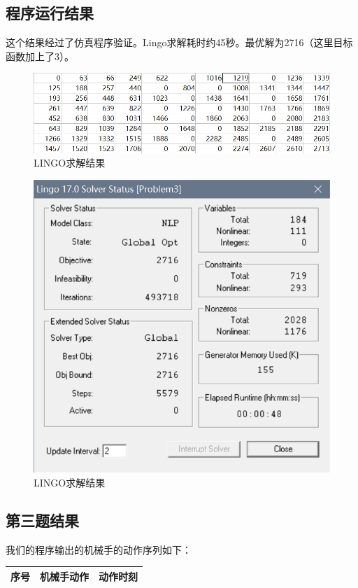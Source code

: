 \documentclass{ctexart}
\begin{document}
{{    }

	\subsection{程序运行结果}
	{
		这个结果经过了仿真程序验证。Lingo求解耗时约45秒。最优解为2716（这里目标函数加上了3）。
		
		\begin{figure}[H]
			\centering
			\includegraphics[width = 0.9\linewidth]{Result3.png}
			\caption{LINGO求解结果}
		\end{figure}
		
		\begin{figure}[H]
			\centering
			\includegraphics[width = 0.7\linewidth]{prob3_raw.png}
			\caption{LINGO求解结果}
		\end{figure}
			
	}

    \subsection{第三题结果}
    {
        我们的程序输出的机械手的动作序列如下：
        
          \begin{longtable}{clc}
        	
        	\toprule
        	序号& 机械手动作& 动作时刻\\
        	\midrule 
        	

\end{longtable}}}
\end{document}
